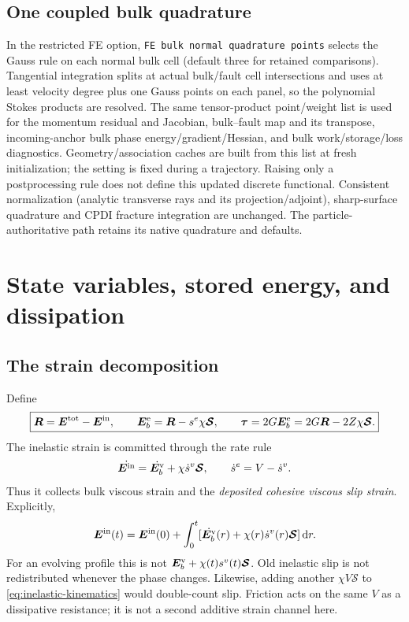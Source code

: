 \documentclass[11pt,a4paper]{article}
\newcommand{\Smat}{\bm{\mathcal S}}
\newcommand{\tauv}{\bm\tau}
\newcommand{\R}{\bm R}
\newcommand{\Ein}{\bm E^{\rm in}}
\newcommand{\Etot}{\bm E^{\rm tot}}
\newcommand{\Eb}{\bm E^{\rm e}_b}
\newcommand{\Ev}{\bm E^{\rm v}_b}
\newcommand{\dd}{\,\mathrm d}
\begin{document}
\subsection{One coupled bulk quadrature}
In the restricted FE option, \texttt{FE bulk normal quadrature points} selects
the Gauss rule on each normal bulk cell (default three for retained comparisons).
Tangential integration splits at actual bulk/fault cell intersections and uses
at least velocity degree plus one Gauss points on each panel, so the polynomial
Stokes products are resolved. The same tensor-product point/weight list is used
for the momentum residual and Jacobian, bulk--fault map and its transpose,
incoming-anchor bulk phase energy/gradient/Hessian, and bulk work/storage/loss
diagnostics. Geometry/association caches are built from this list at fresh
initialization; the setting is fixed during a trajectory. Raising only a
postprocessing rule does not define this updated discrete functional.
Consistent normalization (analytic transverse rays and its projection/adjoint),
sharp-surface quadrature and CPDI fracture integration are unchanged.
The particle-authoritative path retains its native quadrature and defaults.

\section{State variables, stored energy, and dissipation}
\label{sec:energy}

\subsection{The strain decomposition}

Define
\begin{equation}
 \boxed{\R=\Etot-\Ein,\qquad
 \Eb=\R-s^e\chi\Smat,\qquad
 \tauv=2G\Eb=2G\R-2Z\chi\Smat.}
 \label{eq:state-reconstruction}
\end{equation}
The inelastic strain is committed through the rate rule
\begin{equation}
 \dot{\Ein}=\dot{\Ev}+\chi\dot s^v\Smat,
 \qquad \dot s^e=V-\dot s^v.
 \label{eq:inelastic-kinematics}
\end{equation}
Thus it collects bulk viscous strain and the \emph{deposited cohesive viscous
slip strain}. Explicitly,
\begin{equation}
 \Ein(t)=\Ein(0)+\int_0^t
       [\dot{\Ev}(r)+\chi(r)\dot s^v(r)\Smat]\dd r.
 \label{eq:inelastic-memory}
\end{equation}
For an evolving profile this is not $\Ev+\chi(t)s^v(t)\Smat$.
Old inelastic slip is not redistributed whenever the phase changes.
Likewise, adding another $\chi V\Smat$ to \cref{eq:inelastic-kinematics}
would double-count slip. Friction acts on the same $V$ as a dissipative resistance;
it is not a second additive strain channel here.
\end{document}
